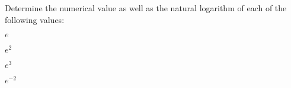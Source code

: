 
\begin{problem}
\item Determine the numerical value as well as the natural logarithm
  of each of the following values:
  \begin{subproblem}
  \item $e$
    \vfill
  \item $e^2$
    \vfill
  \item $e^3$
    \vfill
  \item $e^{-2}$
    \vfill
  \end{subproblem}
\end{problem}


